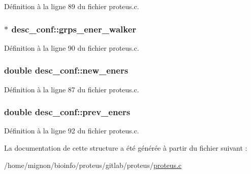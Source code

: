 Définition à la ligne 89 du fichier proteus.\+c.

\hypertarget{structdesc__conf_a316029c599dd209e1f35fff6d8591eba}{
\subsubsection[{grps\+\_\+ener\+\_\+walker}]{$\ast$ desc\+\_\+conf\+::grps\+\_\+ener\+\_\+walker}}\label{structdesc__conf_a316029c599dd209e1f35fff6d8591eba}


Définition à la ligne 90 du fichier proteus.\+c.

\hypertarget{structdesc__conf_a3d3be83590b54f443fbe4d2aecdf089a}{
\subsubsection[{new\+\_\+eners}]{\setlength{\rightskip}{0pt plus 5cm}double desc\+\_\+conf\+::new\+\_\+eners}}\label{structdesc__conf_a3d3be83590b54f443fbe4d2aecdf089a}


Définition à la ligne 87 du fichier proteus.\+c.

\hypertarget{structdesc__conf_ad2afd1ed51338c81a4689671fa4bc15b}{
\subsubsection[{prev\+\_\+eners}]{\setlength{\rightskip}{0pt plus 5cm}double desc\+\_\+conf\+::prev\+\_\+eners}}\label{structdesc__conf_ad2afd1ed51338c81a4689671fa4bc15b}


Définition à la ligne 92 du fichier proteus.\+c.



La documentation de cette structure a été générée à partir du fichier suivant \+:\begin{DoxyCompactItemize}
\item 
/home/mignon/bioinfo/proteus/gitlab/proteus/\hyperlink{proteus_8c}{proteus.\+c}\end{DoxyCompactItemize}
